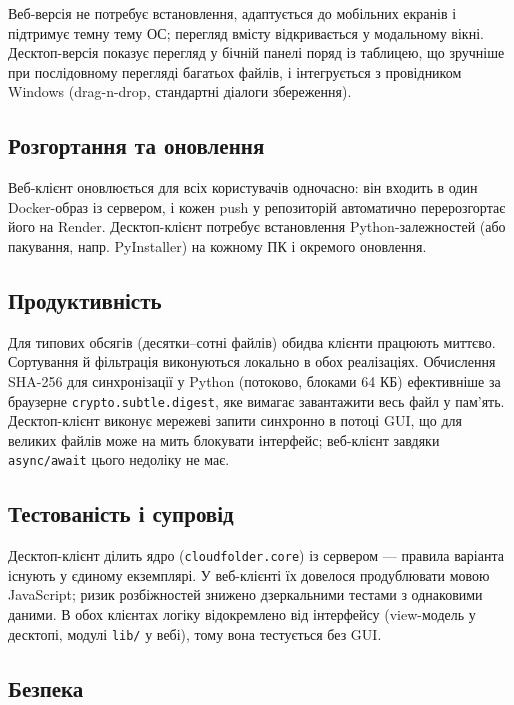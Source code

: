 \documentclass[12pt,a4paper]{article}
\begin{document}
Веб-версія не потребує встановлення, адаптується до мобільних екранів і підтримує темну тему ОС; перегляд вмісту відкривається у модальному вікні. Десктоп-версія показує перегляд у бічній панелі поряд із таблицею, що зручніше при послідовному перегляді багатьох файлів, і інтегрується з провідником Windows (drag-n-drop, стандартні діалоги збереження).

\subsection{Розгортання та оновлення}

Веб-клієнт оновлюється для всіх користувачів одночасно: він входить в один Docker-образ із сервером, і кожен push у репозиторій автоматично перерозгортає його на Render. Десктоп-клієнт потребує встановлення Python-залежностей (або пакування, напр. PyInstaller) на кожному ПК і окремого оновлення.

\subsection{Продуктивність}

Для типових обсягів (десятки--сотні файлів) обидва клієнти працюють миттєво. Сортування й фільтрація виконуються локально в обох реалізаціях. Обчислення SHA-256 для синхронізації у Python (потоково, блоками 64 КБ) ефективніше за браузерне \texttt{crypto.subtle.digest}, яке вимагає завантажити весь файл у пам'ять. Десктоп-клієнт виконує мережеві запити синхронно в потоці GUI, що для великих файлів може на мить блокувати інтерфейс; веб-клієнт завдяки \texttt{async/\allowbreak{}await} цього недоліку не має.

\subsection{Тестованість і супровід}

Десктоп-клієнт ділить ядро (\texttt{cloudfolder.core}) із сервером --- правила варіанта існують у єдиному екземплярі. У веб-клієнті їх довелося продублювати мовою JavaScript; ризик розбіжностей знижено дзеркальними тестами з однаковими даними. В обох клієнтах логіку відокремлено від інтерфейсу (view-модель у десктопі, модулі \texttt{lib/\allowbreak{}} у вебі), тому вона тестується без GUI.

\subsection{Безпека}
\end{document}
